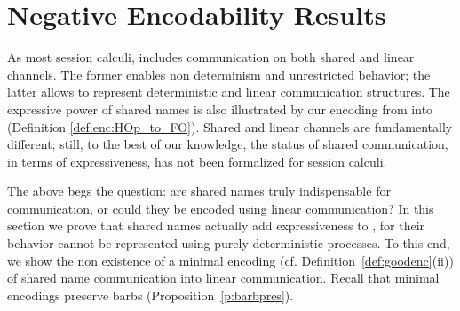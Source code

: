 \section{Negative Encodability Results}
	\label{s:negative}

%

As most session calculi, 
\HOp includes communication on both shared and linear channels.
The former enables non determinism and unrestricted behavior; the latter allows to represent
deterministic and linear communication structures.
The expressive power of shared names is also illustrated by our 
encoding from \HOp into \sessp (Definition \ref{def:enc:HOp_to_FO}).
Shared and linear channels are fundamentally different; still, to the best of our knowledge,
the status of shared communication, in terms of expressiveness, has not been formalized for session calculi.

The above begs the question: are shared names truly indispensable for communication, or could they
be encoded using linear communication?
In this section we prove that shared names actually add expressiveness to \HOp,
for their behavior cannot be represented using purely deterministic processes.
To this end, we show the non existence of a minimal encoding 
(cf. Definition~\ref{def:goodenc}(ii))
of shared name communication into linear 
communication. Recall that minimal encodings preserve barbs (Proposition~\ref{p:barbpres}).

%
%
%



